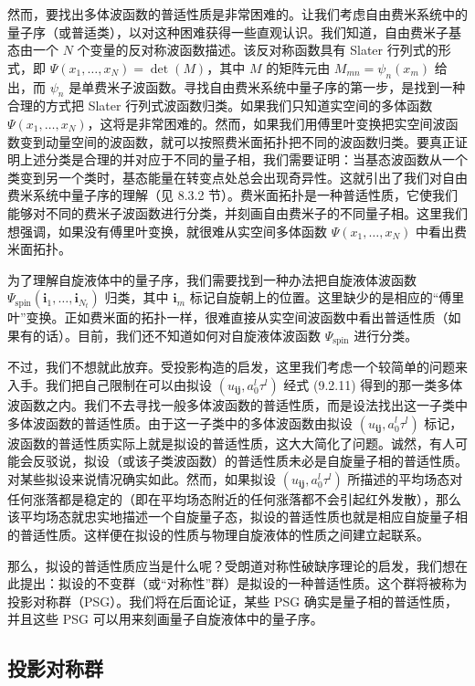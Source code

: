 然而，要找出多体波函数的普适性质是非常困难的。让我们考虑自由费米系统中的量子序（或普适类），以对这种困难获得一些直观认识。我们知道，自由费米子基态由一个 $N$ 个变量的反对称波函数描述。该反对称函数具有 Slater 行列式的形式，即 $\Psi(x_1,\ldots,x_N)=\det(M)$，其中 $M$ 的矩阵元由 $M_{mn}=\psi_n(x_m)$ 给出，而 $\psi_n$ 是单费米子波函数。寻找自由费米系统中量子序的第一步，是找到一种合理的方式把 Slater 行列式波函数归类。如果我们只知道实空间的多体函数 $\Psi(x_1,\ldots,x_N)$，这将是非常困难的。然而，如果我们用傅里叶变换把实空间波函数变到动量空间的波函数，就可以按照费米面拓扑把不同的波函数归类。要真正证明上述分类是合理的并对应于不同的量子相，我们需要证明：当基态波函数从一个类变到另一个类时，基态能量在转变点处总会出现奇异性。这就引出了我们对自由费米系统中量子序的理解（见 8.3.2 节）。费米面拓扑是一种普适性质，它使我们能够对不同的费米子波函数进行分类，并刻画自由费米子的不同量子相。这里我们想强调，如果没有傅里叶变换，就很难从实空间多体函数 $\Psi(x_1,\ldots,x_N)$ 中看出费米面拓扑。

为了理解自旋液体中的量子序，我们需要找到一种办法把自旋液体波函数 $\Psi_{\text{spin}}(\pmb{i}_1,\ldots,\pmb{i}_{N_t})$ 归类，其中 $\pmb{i}_m$ 标记自旋朝上的位置。这里缺少的是相应的“傅里叶”变换。正如费米面的拓扑一样，很难直接从实空间波函数中看出普适性质（如果有的话）。目前，我们还不知道如何对自旋液体波函数 $\Psi_{\text{spin}}$ 进行分类。

不过，我们不想就此放弃。受投影构造的启发，这里我们考虑一个较简单的问题来入手。我们把自己限制在可以由拟设 $(u_{\pmb{ij}},a_0^l\tau^l)$ 经式 (9.2.11) 得到的那一类多体波函数之内。我们不去寻找一般多体波函数的普适性质，而是设法找出这一子类中多体波函数的普适性质。由于这一子类中的多体波函数由拟设 $(u_{\pmb{ij}},a_0^l\tau^l)$ 标记，波函数的普适性质实际上就是拟设的普适性质，这大大简化了问题。诚然，有人可能会反驳说，拟设（或该子类波函数）的普适性质未必是自旋量子相的普适性质。对某些拟设来说情况确实如此。然而，如果拟设 $(u_{\pmb{ij}},a_0^l\tau^l)$ 所描述的平均场态对任何涨落都是稳定的（即在平均场态附近的任何涨落都不会引起红外发散），那么该平均场态就忠实地描述一个自旋量子态，拟设的普适性质也就是相应自旋量子相的普适性质。这样便在拟设的性质与物理自旋液体的性质之间建立起联系。

那么，拟设的普适性质应当是什么呢？受朗道对称性破缺序理论的启发，我们想在此提出：拟设的不变群（或“对称性”群）是拟设的一种普适性质。这个群将被称为投影对称群（PSG）。我们将在后面论证，某些 PSG 确实是量子相的普适性质，并且这些 PSG 可以用来刻画量子自旋液体中的量子序。

\subsection{投影对称群}

